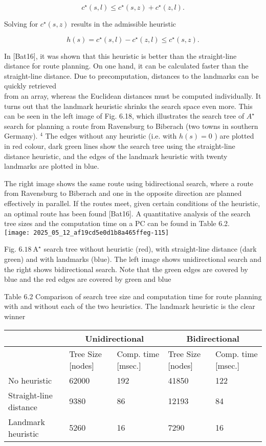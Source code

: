 \documentclass[10pt]{article}
\begin{document}
$$
c^{\star}(s, l) \leq c^{\star}(s, z)+c^{\star}(z, l) .
$$

Solving for $c^{\star}(s, z)$ results in the admissible heuristic

$$
h(s)=c^{\star}(s, l)-c^{\star}(z, l) \leq c^{\star}(s, z) .
$$

In [Bat16], it was shown that this heuristic is better than the straight-line distance for route planning. On one hand, it can be calculated faster than the straight-line distance. Due to precomputation, distances to the landmarks can be quickly retrieved\\
from an array, whereas the Euclidean distances must be computed individually. It turns out that the landmark heuristic shrinks the search space even more. This can be seen in the left image of Fig. 6.18, which illustrates the search tree of $A^{\star}$ search for planning a route from Ravensburg to Biberach (two towns in southern Germany). ${ }^{4}$ The edges without any heuristic (i.e. with $h(s)=0$ ) are plotted in red colour, dark green lines show the search tree using the straight-line distance heuristic, and the edges of the landmark heuristic with twenty landmarks are plotted in blue.

The right image shows the same route using bidirectional search, where a route from Ravensburg to Biberach and one in the opposite direction are planned effectively in parallel. If the routes meet, given certain conditions of the heuristic, an optimal route has been found [Bat16]. A quantitative analysis of the search tree sizes and the computation time on a PC can be found in Table 6.2.\\
\texttt{[image: 2025\_05\_12\_af19cd5e0d1b8a465ffeg-115]}

Fig. $6.18 \mathrm{~A}^{\star}$ search tree without heuristic (red), with straight-line distance (dark green) and with landmarks (blue). The left image shows unidirectional search and the right shows bidirectional search. Note that the green edges are covered by blue and the red edges are covered by green and blue

Table 6.2 Comparison of search tree size and computation time for route planning with and without each of the two heuristics. The landmark heuristic is the clear winner

\begin{center}
\begin{tabular}{|l|l|l|l|l|}
\hline
\multirow{2}{*}{} & \multicolumn{2}{|c|}{Unidirectional} & \multicolumn{2}{|c|}{Bidirectional} \\
\hline
 & Tree Size [nodes] & Comp. time [msec.] & Tree Size [nodes] & Comp. time [msec.] \\
\hline
No heuristic & 62000 & 192 & 41850 & 122 \\
\hline
Straight-line distance & 9380 & 86 & 12193 & 84 \\
\hline
Landmark heuristic & 5260 & 16 & 7290 & 16 \\
\hline
\end{tabular}
\end{center}
\end{document}
